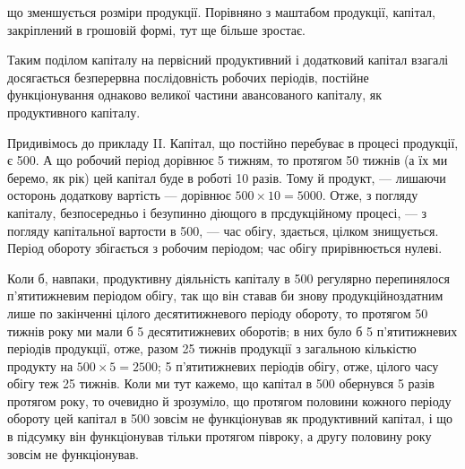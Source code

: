 \parcont{}  %
що зменшується розміри продукції. Порівняно з маштабом продукції, капітал,
закріплений в грошовій формі, тут ще більше зростає.

Таким поділом капіталу на первісний продуктивний і додатковий капітал
взагалі досягається безперервна послідовність робочих періодів, постійне
функціонування однаково великої частини авансованого капіталу,
як продуктивного капіталу.

Придивімось до прикладу II. Капітал, що постійно перебуває в процесі
продукції, є 500. А що робочий період дорівнює 5 тижням,
то протягом 50 тижнів (а їх ми беремо, як рік) цей капітал буде в
роботі 10 разів. Тому й продукт, — лишаючи осторонь додаткову вартість
— дорівнює $500 × 10 = 5000$. Отже, з погляду капіталу,
безпосередньо і безупинно діющого в прсдукційному процесі, — з погляду
капітальної вартости в 500, — час обігу, здається, цілком
знищується. Період обороту збігається з робочим періодом; час обігу прирівнюється
нулеві.

Коли б, навпаки, продуктивну діяльність капіталу в 500 регулярно
перепинялося п’ятитижневим періодом обігу, так що він ставав
би знову продукційноздатним лише по закінченні цілого десятитижневого
періоду обороту, то протягом 50 тижнів року ми мали б 5 десятитижневих
оборотів; в них було б 5 п’ятитижневих періодів продукції, отже,
разом 25 тижнів продукції з загальною кількістю продукту на $500 × 5 = 2500$; 5 п’ятитижневих періодів обігу, отже, цілого часу обігу теж
25 тижнів. Коли ми тут кажемо, що капітал в 500 обернувся
5 разів протягом року, то очевидно й зрозуміло, що протягом половини
кожного періоду обороту цей капітал в 500 зовсім не функціонував
як продуктивний капітал, і що в підсумку він функціонував тільки
протягом півроку, а другу половину року зовсім не функціонував.

